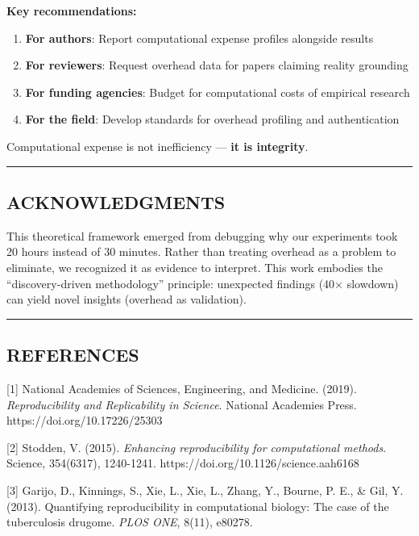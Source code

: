 \documentclass[
]{article}
\providecommand{\tightlist}{%
  \setlength{\itemsep}{0pt}\setlength{\parskip}{0pt}}
\begin{document}
\textbf{Key recommendations:}

\begin{enumerate}
\def\labelenumi{\arabic{enumi}.}
\tightlist
\item
  \textbf{For authors}: Report computational expense profiles alongside
  results
\item
  \textbf{For reviewers}: Request overhead data for papers claiming
  reality grounding
\item
  \textbf{For funding agencies}: Budget for computational costs of
  empirical research
\item
  \textbf{For the field}: Develop standards for overhead profiling and
  authentication
\end{enumerate}

Computational expense is not inefficiency --- \textbf{it is integrity}.

\begin{center}\rule{0.5\linewidth}{0.5pt}\end{center}

\subsection{ACKNOWLEDGMENTS}\label{acknowledgments}

This theoretical framework emerged from debugging why our experiments
took 20 hours instead of 30 minutes. Rather than treating overhead as a
problem to eliminate, we recognized it as evidence to interpret. This
work embodies the ``discovery-driven methodology'' principle: unexpected
findings (40× slowdown) can yield novel insights (overhead as
validation).

\begin{center}\rule{0.5\linewidth}{0.5pt}\end{center}

\subsection{REFERENCES}\label{references}

{[}1{]} National Academies of Sciences, Engineering, and Medicine.
(2019). \emph{Reproducibility and Replicability in Science}. National
Academies Press. https://doi.org/10.17226/25303

{[}2{]} Stodden, V. (2015). \emph{Enhancing reproducibility for
computational methods}. Science, 354(6317), 1240-1241.
https://doi.org/10.1126/science.aah6168

{[}3{]} Garijo, D., Kinnings, S., Xie, L., Xie, L., Zhang, Y., Bourne,
P. E., \& Gil, Y. (2013). Quantifying reproducibility in computational
biology: The case of the tuberculosis drugome. \emph{PLOS ONE}, 8(11),
e80278.
\end{document}
